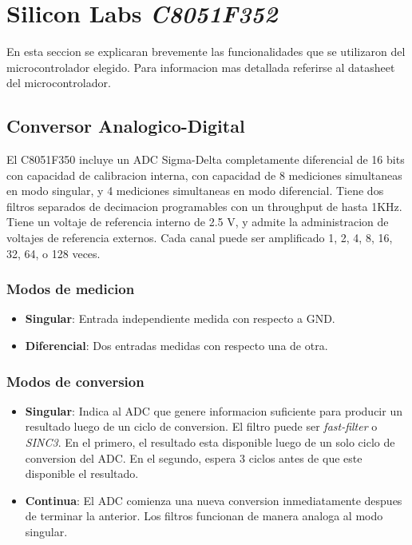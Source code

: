 \section{Silicon Labs \emph{C8051F352}}
En esta seccion se explicaran brevemente las funcionalidades que se utilizaron del microcontrolador elegido. Para informacion mas detallada referirse al datasheet del microcontrolador. \cite{bib:datasheet}

\subsection{Conversor Analogico-Digital}\label{sec:adc}
El C8051F350 incluye un ADC Sigma-Delta completamente diferencial de 16 bits con capacidad de calibracion interna, con capacidad de 8 mediciones simultaneas en modo singular, y 4 mediciones simultaneas en modo diferencial. Tiene dos filtros separados de decimacion programables con un throughput de hasta 1KHz. Tiene un voltaje de referencia interno de 2.5 V, y admite la administracion de voltajes de referencia externos. Cada canal puede ser amplificado 1, 2, 4, 8, 16, 32, 64, o 128 veces.

\subsubsection{Modos de medicion}
\begin{itemize}
  \item \textbf{Singular}: Entrada independiente medida con respecto a GND.
  \item \textbf{Diferencial}: Dos entradas medidas con respecto una de otra.
\end{itemize}

\subsubsection{Modos de conversion}
\begin{itemize}
  \item \textbf{Singular}: Indica al ADC que genere informacion suficiente para producir un resultado luego de un ciclo de conversion. El filtro puede ser \emph{fast-filter} o \emph{SINC3}. En el primero, el resultado esta disponible luego de un solo ciclo de conversion del ADC. En el segundo, espera 3 ciclos antes de que este disponible el resultado.
  \item \textbf{Continua}: El ADC comienza una nueva conversion inmediatamente despues de terminar la anterior. Los filtros funcionan de manera analoga al modo singular.
\end{itemize}

